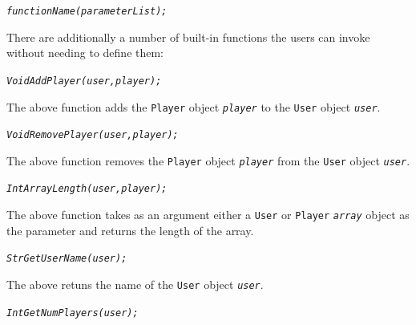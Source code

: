 \documentclass[12pt]{report}
\begin{document}
\begin{alltt}\begin{singlespace}
            \textit{functionName(parameterList);}\end{singlespace}
\end{alltt}

There are additionally a number of built-in functions the users can invoke without needing to define them:

\begin{alltt}\begin{singlespace}
            \textit{Void AddPlayer(user, player);}\end{singlespace}
\end{alltt}

The above function adds the \texttt{Player} object \textit{\texttt{player}} to the \texttt{User} object \textit{\texttt{user}}.

\begin{alltt}\begin{singlespace}
            \textit{Void RemovePlayer(user, player);}\end{singlespace}
\end{alltt}

The above function removes the \texttt{Player} object \textit{\texttt{player}} from the \texttt{User} object \textit{\texttt{user}}.

\begin{alltt}\begin{singlespace}
            \textit{Int ArrayLength(user, player);}\end{singlespace}
\end{alltt}

The above function takes as an argument either a \texttt{User} or \texttt{Player} \textit{\texttt{array}} object as the parameter and returns the length of the array.

\begin{alltt}\begin{singlespace}
            \textit{Str GetUserName(user);}\end{singlespace}
\end{alltt}

The above retuns the name of the \texttt{User} object \textit{\texttt{user}}.

\begin{alltt}\begin{singlespace}
            \textit{Int GetNumPlayers(user);}\end{singlespace}
\end{alltt}
     
\end{document}
